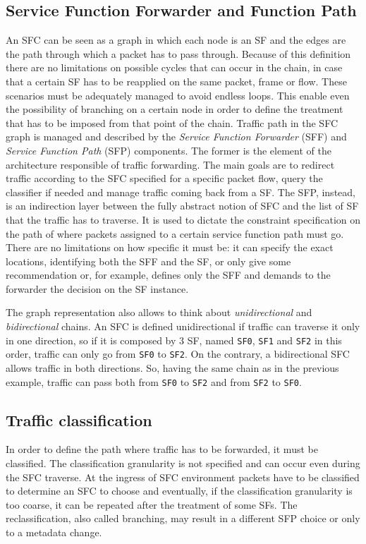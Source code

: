 \subsection{Service Function Forwarder and Function Path}
An SFC can be seen as a graph in which each node is an SF and the edges are the
path
through which a packet has to pass through. Because of this definition there
are no limitations on possible cycles that can occur in the chain, in case that
a certain SF has to be reapplied on the same packet, frame or flow. These
scenarios must be adequately managed to avoid endless loops. This enable even
the possibility of branching on a certain node in order to define the treatment
that has to be imposed from that point of the chain. Traffic path in the SFC
graph is managed and described by the \emph{Service Function Forwarder} (SFF)
and \emph{Service Function Path} (SFP) components. The former is the element of
the architecture responsible of traffic forwarding. The main goals are to
redirect traffic according to the SFC specified for a specific packet flow,
query the classifier if needed and manage traffic coming back from a SF. The
SFP, instead, is an indirection layer between the fully abstract notion of SFC
and the list of SF that the traffic has to traverse. It is used to dictate the
constraint specification on the path of where packets assigned to a certain
service function path must go. There are no limitations on how specific it must
be: it can specify the exact locations, identifying both the SFF and the SF, or
only give some recommendation or, for example, defines only the SFF and
demands to the forwarder the decision on the SF instance.

The graph representation also allows to think about \emph{unidirectional} and
\emph{bidirectional} chains. An SFC is defined unidirectional if traffic can
traverse it only in one direction, so if it is composed by 3 SF, named
\texttt{SF0}, \texttt{SF1} and \texttt{SF2} in this order, traffic can only go
from \texttt{SF0} to \texttt{SF2}. On the contrary, a bidirectional SFC allows
traffic in both directions. So, having the same chain as in the previous
example, traffic can pass both from \texttt{SF0} to \texttt{SF2} and from
\texttt{SF2} to \texttt{SF0}.

\subsection{Traffic classification}
In order to define the path where traffic has to be forwarded, it must be
classified. The classification granularity is not specified and can occur even
during the SFC traverse. At the ingress of SFC environment packets have to be
classified to determine an SFC to choose and eventually, if the classification
granularity is too coarse, it can be repeated after the treatment of some SFs.
The reclassification, also called branching, may result in a different SFP
choice or only to a metadata change.


